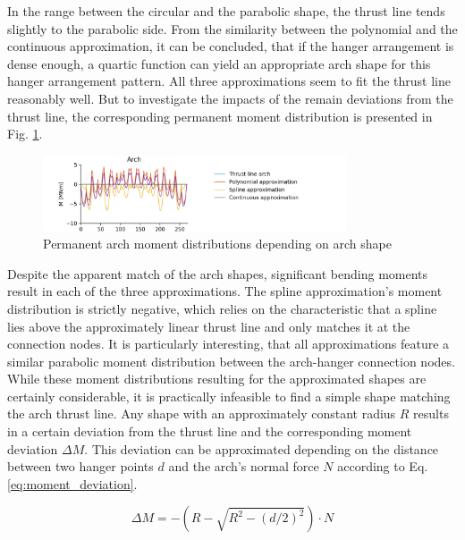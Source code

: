 In the range between the circular and the parabolic shape, the thrust line tends slightly to the parabolic side. From the similarity between the polynomial and the continuous approximation, it can be concluded, that if the hanger arrangement is dense enough, a quartic function can yield an appropriate arch shape for this hanger arrangement pattern. All three approximations seem to fit the thrust line reasonably well. But to investigate the impacts of the remain deviations from the thrust line, the corresponding permanent moment distribution is presented in Fig. \ref{fig:arch_permanent_moments_13}.

\begin{figure}[H]
    \centering
    \includegraphics[trim={0 0 2cm 0},clip, width=0.8\textwidth]{calculations/arch shape/permanent state_13.png}
    \caption{Permanent arch moment distributions depending on arch shape}
    \label{fig:arch_permanent_moments_13}
\end{figure}

Despite the apparent match of the arch shapes, significant bending moments result in each of the three approximations. The spline approximation's moment distribution is strictly negative, which relies on the characteristic that a spline lies above the approximately linear thrust line and only matches it at the connection nodes. It is particularly interesting, that all approximations feature a similar parabolic moment distribution between the arch-hanger connection nodes. While these moment distributions resulting for the approximated shapes are certainly considerable, it is practically infeasible to find a simple shape matching the arch thrust line. Any shape with an approximately constant radius $R$ results in a certain deviation from the thrust line and the corresponding moment deviation $\Delta M$. This deviation can be approximated depending on the distance between two hanger points $d$ and the arch's normal force $N$ according to Eq. \eqref{eq:moment_deviation}.

\begin{equation}
    \Delta M=-\left(R-\sqrt{R^2-\left(d/2\right)^2}\right) \cdot N
    \label{eq:moment_deviation}
\end{equation}

